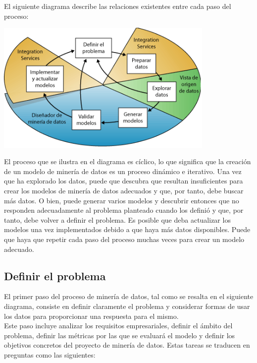 \documentclass[a4paper, 11pt]{article} %
\begin{document}
El siguiente diagrama describe las relaciones existentes entre cada paso del proceso:

\begin{center}
\includegraphics[width=300pt]{proceso}
\end{center}

El proceso que se ilustra en el diagrama es cíclico, lo que significa que la creación de un modelo de minería de datos es un proceso dinámico e iterativo. Una vez que ha explorado los datos, puede que descubra que resultan insuficientes para crear los modelos de minería de datos adecuados y que, por tanto, debe buscar más datos. O bien, puede generar varios modelos y descubrir entonces que no responden adecuadamente al problema planteado cuando los definió y que, por tanto, debe volver a definir el problema. Es posible que deba actualizar los modelos una vez implementados debido a que haya más datos disponibles. Puede que haya que repetir cada paso del proceso muchas veces para crear un modelo adecuado.

\subsection*{Definir el problema}

El primer paso del proceso de minería de datos, tal como se resalta en el siguiente diagrama, consiste en definir claramente el problema y considerar formas de usar los datos para proporcionar una respuesta para el mismo.\\

Este paso incluye analizar los requisitos empresariales, definir el ámbito del problema, definir las métricas por las que se evaluará el modelo y definir los objetivos concretos del proyecto de minería de datos. Estas tareas se traducen en preguntas como las siguientes:
\end{document}
